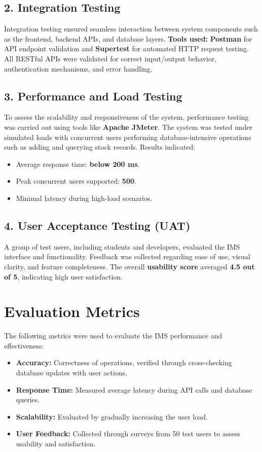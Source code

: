 \documentclass[12pt,a4paper]{article}
\begin{document}
\subsection*{2. Integration Testing}
Integration testing ensured seamless interaction between system components such as the frontend, backend APIs, and database layers.  
\textbf{Tools used:} \textbf{Postman} for API endpoint validation and \textbf{Supertest} for automated HTTP request testing.  
All RESTful APIs were validated for correct input/output behavior, authentication mechanisms, and error handling.

\subsection*{3. Performance and Load Testing}
To assess the scalability and responsiveness of the system, performance testing was carried out using tools like \textbf{Apache JMeter}.  
The system was tested under simulated loads with concurrent users performing database-intensive operations such as adding and querying stock records.  
Results indicated:
\begin{itemize}
    \item Average response time: \textbf{below 200 ms}.
    \item Peak concurrent users supported: \textbf{500}.
    \item Minimal latency during high-load scenarios.
\end{itemize}

\subsection*{4. User Acceptance Testing (UAT)}
A group of test users, including students and developers, evaluated the IMS interface and functionality. Feedback was collected regarding ease of use, visual clarity, and feature completeness.  
The overall \textbf{usability score} averaged \textbf{4.5 out of 5}, indicating high user satisfaction.

\section{Evaluation Metrics}
The following metrics were used to evaluate the IMS performance and effectiveness:

\begin{itemize}
    \item \textbf{Accuracy:} Correctness of operations, verified through cross-checking database updates with user actions.
    \item \textbf{Response Time:} Measured average latency during API calls and database queries.
    \item \textbf{Scalability:} Evaluated by gradually increasing the user load.
    \item \textbf{User Feedback:} Collected through surveys from 50 test users to assess usability and satisfaction.
\end{itemize}
\end{document}
